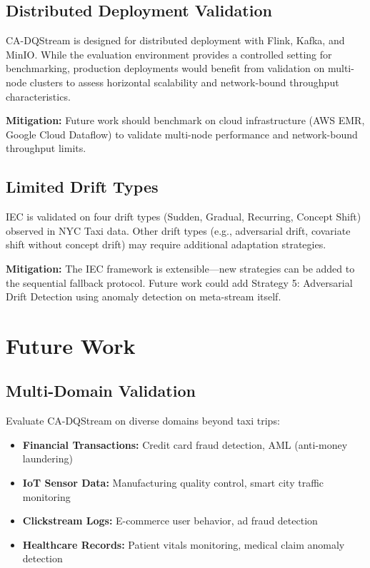 \subsection{Distributed Deployment Validation}

CA-DQStream is designed for distributed deployment with Flink, Kafka, and MinIO. While the evaluation environment provides a controlled setting for benchmarking, production deployments would benefit from validation on multi-node clusters to assess horizontal scalability and network-bound throughput characteristics.

\textbf{Mitigation:} Future work should benchmark on cloud infrastructure (AWS EMR, Google Cloud Dataflow) to validate multi-node performance and network-bound throughput limits.

\subsection{Limited Drift Types}

IEC is validated on four drift types (Sudden, Gradual, Recurring, Concept Shift) observed in NYC Taxi data. Other drift types (e.g., adversarial drift, covariate shift without concept drift) may require additional adaptation strategies.

\textbf{Mitigation:} The IEC framework is extensible---new strategies can be added to the sequential fallback protocol. Future work could add Strategy 5: Adversarial Drift Detection using anomaly detection on meta-stream itself.

\section{Future Work}

\subsection{Multi-Domain Validation}

Evaluate CA-DQStream on diverse domains beyond taxi trips:
\begin{itemize}
    \item \textbf{Financial Transactions:} Credit card fraud detection, AML (anti-money laundering)
    \item \textbf{IoT Sensor Data:} Manufacturing quality control, smart city traffic monitoring
    \item \textbf{Clickstream Logs:} E-commerce user behavior, ad fraud detection
    \item \textbf{Healthcare Records:} Patient vitals monitoring, medical claim anomaly detection
\end{itemize}

